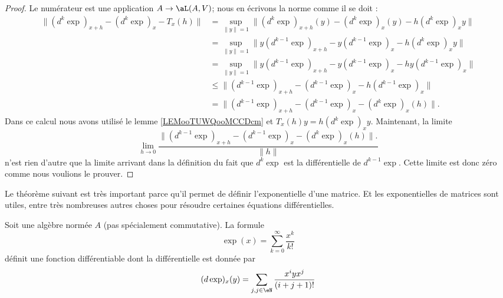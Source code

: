 \begin{proof}
    Le numérateur est une application \( A\to \aL(A,V)\); nous en écrivons la norme comme il se doit :
    \begin{subequations}
        \begin{align}
            \|   (d^k\exp)_{x+h}-(d^k\exp)_x-T_x(h) \|&=\sup_{\| y \|=1}\| (d^{k}\exp)_{x+h}(y)-(d^k\exp)_x(y)-h(d^{k}\exp)_xy \|\\
            &=\sup_{\| y \|=1}\| y(d^{k-1}\exp)_{x+h}-y(d^{k-1}\exp)_x-h(d^k\exp)_xy \|\\
            &=\sup_{\| y \|=1}\| y(d^{k-1}\exp)_{x+h}-y(d^{k-1}\exp)_x-hy(d^{k-1}\exp)_x \|\\
            &\leq \| (d^{k-1}\exp)_{x+h}-(d^{k-1}\exp)_x-h(d^{k-1}\exp)_x \|\\
            &=\| (d^{k-1}\exp)_{x+h}-(d^{k-1}\exp)_x-(d^{k}\exp)_x(h) \|.
        \end{align}
    \end{subequations}
    Dans ce calcul nous avons utilisé le lemme \ref{LEMooTUWQooMCCDcm} et \( T_x(h)y=h(d^{k}\exp)_xy\).
    Maintenant, la limite
    \begin{equation}
        \lim_{h\to 0} \frac{  \| (d^{k-1}\exp)_{x+h}-(d^{k-1}\exp)_x-(d^{k}\exp)_x(h) \|.}{ \| h \| }
    \end{equation}
    n'est rien d'autre que la limite arrivant dans la définition du fait que \( d^k\exp\) est la différentielle de \( d^{k-1}\exp\). Cette limite est donc zéro comme nous voulions le prouver.
\end{proof}


Le théorème suivant est très important parce qu'il permet de définir l'exponentielle d'une matrice. Et les exponentielles de matrices sont utiles, entre très nombreuses autres choses pour résoudre certaines équations différentielles.
\begin{theoremDef}      \label{THOooFGTQooZPiVLO}
    Soit une algèbre normée \( A\) (pas spécialement commutative). La formule
    \begin{equation}
        \exp(x)=\sum_{k=0}^{\infty}\frac{ x^k }{ k! }
    \end{equation}
    définit une fonction différentiable dont la différentielle est donnée par
    \begin{equation}        \label{EQooFGPPooZKHeXU}
        (d\exp)_x(y)=\sum_{j,j\in \eN}\frac{ x^iyx^j }{ (i+j+1)! }
    \end{equation}
\end{theoremDef}

